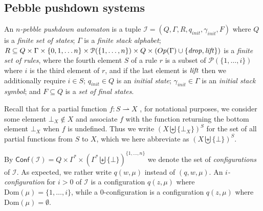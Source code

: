 \documentclass[a4paper,UKenglish,cleveref, autoref, thm-restate]{lipics-v2021}
\newcommand\mh[1]{\todo[inline,size=\scriptsize]{#1 - \textbf{Mathieu}}}
\newcommand{\Conf}{\mathsf{Conf}}
\newcommand{\Op}{\mathsf{Op}}
\begin{document}
\subsection{Pebble pushdown systems}

\newcommand{\ppda}{\mathcal{I}}

An {\em $n$-pebble pushdown automaton} 
is a tuple 
$\ppda = (Q, \Gamma,  R, q_{init}, \gamma_{init}, F)$
where $Q$ is a {\em finite set of  states}; $\Gamma$ is a {\em finite stack alphabet};
  $R  \subseteq  Q  \times \Gamma \times
		 \{ 0, 1, \ldots n\} \times \mathcal{P}(\{1,\ldots,n\})
		 \times Q  \times (\Op(\Gamma) \cup \{\text{\textit{drop}}, \text{\textit{lift}}\})$ is a {\em finite set of rules},
		 where the fourth element $S$ of a rule $r$ is a subset of 
		$\mathcal{P}(\{1,\ldots,i\})$ where $i$ is the third element of $r$,
		and if the last element is
		$\text{\textit{lift}}$ then we additionally require $i \in S$;
 $q_{init} \in Q$ is an {\em initial  state};
 $\gamma_{init} \in \Gamma$ is an {\em initial stack symbol}; and
 $F \subseteq Q$ is a {\em set of final  states}.


 
 
\par\noindent\ignorespacesafterend 
Recall that for a partial function $ f : S \rightharpoonup X $%
, for notational purposes, we consider some element $\bot_X \not\in X$ and 
 associate $f$ with the function returning the 
bottom element $\bot_X$ when $f$ is undefined. Thus we write $(X \biguplus \{ \bot_X \})^S$ for the set of all partial functions from $S$ to $X$, which we here abbreviate as $(X \biguplus \{ \bot \})^S$. 


 
 
By $\Conf(\ppda)=Q\times \Gamma^* \times (\Gamma^* \biguplus \{ \bot \})^{\{1, \ldots, n\}}$ we denote the set of
{\em configurations} of $\ppda$. As expected, we rather write $q(w, \mu)$ instead of $(q, w, \mu)$.
An {\em$i$-configuration} for $i > 0$ of $\ppda$ is a configuration $q(z,\mu)$ where
$\text{Dom}(\mu) = \{1, \ldots, i\}$, while a $0$-configuration is a configuration 
 $q(z,\mu)$ where $\text{Dom}(\mu)=\emptyset$.
\end{document}
